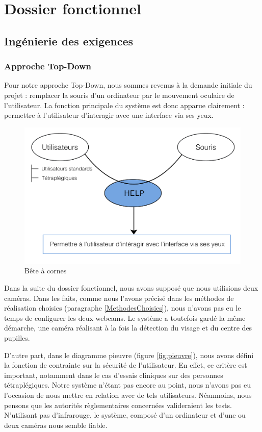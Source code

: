 \chapter{Dossier fonctionnel}
\section{Ingénierie des exigences}
\subsection{Approche Top-Down}
\label{sec:top-down}

Pour notre approche Top-Down, nous sommes revenus à la demande initiale du projet : remplacer la souris d'un ordinateur par le mouvement oculaire de l'utilisateur. La fonction principale du système est donc apparue clairement : permettre à l'utilisateur d'interagir avec une interface via ses yeux. 

\begin{figure}[h]
  \centering
  \includegraphics[scale=1]{BeteACornes}
  \caption{Bête à cornes}
  \label{fig:bac}
\end{figure}

Dans la suite du dossier fonctionnel, nous avons supposé que nous utilisions deux caméras. Dans les faits, comme nous l'avons précisé dans les méthodes de réalisation choisies (paragraphe \ref{MethodesChoisies}), nous n'avons pas eu le temps de configurer les deux webcams. Le système a toutefois gardé la même démarche, une caméra réalisant à la fois la détection du visage et du centre des pupilles. 

D'autre part, dans le diagramme pieuvre (figure \ref{fig:pieuvre}), nous avons défini la fonction de contrainte sur la sécurité de l'utilisateur. En effet, ce critère est important, notamment dans le cas d'essais cliniques sur des personnes tétraplégiques. Notre système n'étant pas encore au point, nous n'avons pas eu l'occasion de nous mettre en relation avec de tels utilisateurs. Néanmoins, nous pensons que les autorités règlementaires concernées valideraient les tests. N'utilisant pas d'infrarouge, le système, composé d'un ordinateur et d'une ou deux caméras nous semble fiable. 

